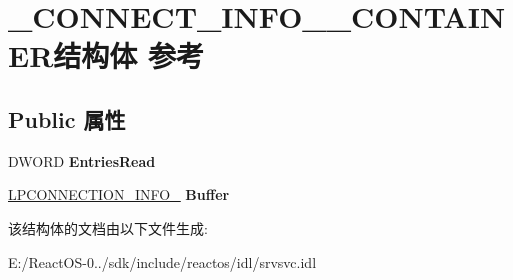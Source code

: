 \hypertarget{struct___c_o_n_n_e_c_t___i_n_f_o__0___c_o_n_t_a_i_n_e_r}{}\section{\+\_\+\+C\+O\+N\+N\+E\+C\+T\+\_\+\+I\+N\+F\+O\+\_\+\_\+\+C\+O\+N\+T\+A\+I\+N\+E\+R结构体 参考}
\label{struct___c_o_n_n_e_c_t___i_n_f_o__0___c_o_n_t_a_i_n_e_r}
\subsection*{Public 属性}
\begin{DoxyCompactItemize}
\item 
\mbox{\label{struct___c_o_n_n_e_c_t___i_n_f_o__0___c_o_n_t_a_i_n_e_r_a25fd63a32f37c3e3453e607a0086894a}} 
D\+W\+O\+RD {\bfseries Entries\+Read}
\item 
\mbox{\label{struct___c_o_n_n_e_c_t___i_n_f_o__0___c_o_n_t_a_i_n_e_r_a1ae8471aab44b3a36202a0580ffba36c}} 
\hyperlink{struct___c_o_n_n_e_c_t_i_o_n___i_n_f_o__0}{L\+P\+C\+O\+N\+N\+E\+C\+T\+I\+O\+N\+\_\+\+I\+N\+F\+O\+\_} {\bfseries Buffer}
\end{DoxyCompactItemize}


该结构体的文档由以下文件生成\+:\begin{DoxyCompactItemize}
\item 
E\+:/\+React\+O\+S-\/0../sdk/include/reactos/idl/srvsvc.\+idl\end{DoxyCompactItemize}

